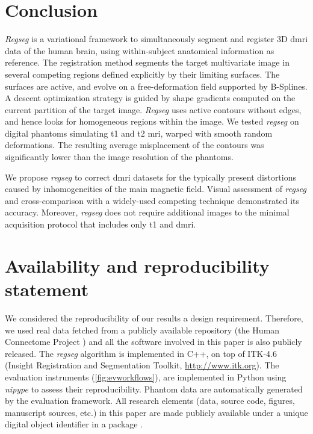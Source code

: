 \section*{Conclusion}
\label{sec:conclusion}

\emph{Regseg} is a variational framework to simultaneously segment and
  register 3D \gls*{dmri} data of the human brain, using within-subject
  anatomical information as reference.
The registration method segments the target multivariate image in several competing regions
  defined explicitly by their limiting surfaces.
The surfaces are active, and evolve on a free-deformation field supported by B-Splines.
A descent optimization strategy is guided by shape gradients computed on the current partition
  of the target image.
\emph{Regseg} uses active contours without edges, and hence looks for
  homogeneous regions within the image.
We tested \emph{regseg} on digital phantoms simulating \gls*{t1} and \gls*{t2} \gls*{mri},
	warped with smooth random deformations.
The resulting average misplacement of the contours was significantly lower than the
  image resolution of the phantoms.

We propose \emph{regseg} to correct \gls*{dmri} datasets for the typically present distortions
  caused by inhomogeneities of the main magnetic field.
Visual assessment of \emph{regseg} and cross-comparison with a widely-used competing
  technique demonstrated its accuracy.
Moreover, \emph{regseg} does not require additional images to the minimal acquisition protocol
  that includes only \gls*{t1} and \gls*{dmri}.

\section*{Availability and reproducibility statement}
\label{sec:availability}
We considered the reproducibility of our results a design requirement.
Therefore, we used real data fetched from a publicly available repository
  (the Human Connectome Project \citep{essen_human_2012}) and all the software
  involved in this paper is also publicly released.
The \emph{regseg} algorithm is implemented in C++, on top of ITK-4.6
  (Insight Registration and Segmentation Toolkit, \url{http://www.itk.org}).
The evaluation instruments (\autoref{fig:evworkflows}), are implemented in Python using
  \emph{nipype} \citep{gorgolewski_nipype_2011} to assess their reproducibility.
Phantom data are automatically generated by the evaluation framework.
All research elements (data, source code, figures, manuscript sources, etc.) in this paper
  are made publicly available under a unique digital object identifier in a
  package \citep{esteban_acweregistration_2015}.